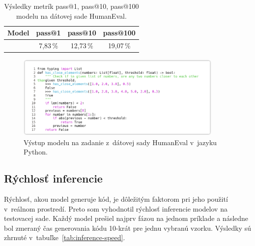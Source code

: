 \begin{table}[!ht]
    \centering
    \begin{tabular}{r|c|c|c}
        \textbf{Model} & \textbf{pass@1} & \textbf{pass@10} & \textbf{pass@100} \\ \hline
        \MCfim{} & 7,83\,\% & 12,73\,\% & 19,07\,\% \\
    \end{tabular}
    \caption{Výsledky metrík pass@1, pass@10, pass@100 modelu \MCfim{} na dátovej sade HumanEval.}
    \label{tab:humaneval-results}
\end{table}

\begin{figure}[H]
    \centering
    \includegraphics[width=0.9\textwidth]{obrazky/fim-python2.png}
    \caption{Výstup modelu \MCfim{} na zadanie z~dátovej sady HumanEval v~jazyku Python.}
    \label{fig:microcoderfim-python}
\end{figure}

\subsection{Rýchlosť inferencie}

Rýchlosť, akou model generuje kód, je dôležitým faktorom pri jeho použití v~reálnom prostredí. Preto som vyhodnotil rýchlosť inferencie modelov na testovacej sade. Každý model prešiel najprv fázou  na jednom príklade a následne bol zmeraný čas generovania kódu 10-krát pre jednu vybranú vzorku. Výsledky sú zhrnuté v~tabuľke~\ref{tab:inference-speed}.

